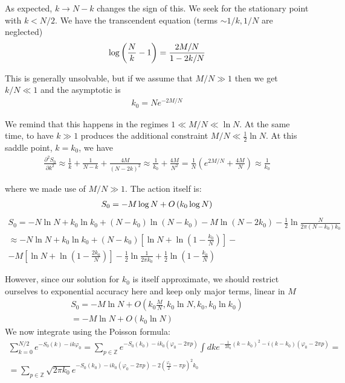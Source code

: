As expected, $k\to N-k$ changes the sign of this. We seek for the
stationary point with $k<N/2$. We have the transcendent equation
(terms $\sim1/k,1/N$ are neglected)
\begin{gather}
	\log\left(\frac{N}{k}-1\right)=\frac{2M/N}{1-2k/N}
\end{gather}


This is generally unsolvable, but if we assume that $M/N\gg1$ then
we get $k/N\ll1$ and the asymptotic is
\begin{gather}
k_{0}  =Ne^{-2M/N}
\end{gather}

We remind that this happens in the regimes $1\ll M/N\ll\ln N$. At
the same time, to have $k\gg1$ produces the additional constraint
$M/N\ll\frac{1}{2}\ln N$. At this saddle point, $k=k_{0}$, we have
\begin{gather}
\frac{\partial^{2}S_{0}}{\partial k^{2}}\approx\frac{1}{k}+\frac{1}{N-k}+\frac{4M}{(N-2k)^{2}}\approx\frac{1}{k_{0}}+\frac{4M}{N^{2}}=\frac{1}{N}\left(e^{2M/N}+\frac{4M}{N}\right)\approx\frac{1}{k_{0}}
\end{gather}

where we made use of $M/N\gg1$. The action itself is:
\begin{gather}
\label{mixed_refl_action}
S_0 = -M\log N + O\left(k_0 \log N\right)
\end{gather}
\begin{multline*}
S_{0}=-N\ln N+k_{0}\ln k_{0}+(N-k_{0})\ln(N-k_{0})-M\ln(N-2k_{0})-\frac{1}{2}\ln\frac{N}{2\pi(N-k_{0})k_{0}}\\
\approx-N\ln N+k_{0}\ln k_{0}+(N-k_{0})\left[\ln N+\ln(1-\frac{k_{0}}{N})\right]-\\
-M\left[\ln N+\ln(1-\frac{2k_{0}}{N})\right]-\frac{1}{2}\ln\frac{1}{2\pi k_{0}}+\frac{1}{2}\ln(1-\frac{k_{0}}{N})
\end{multline*}

However, since our solution for $k_{0}$ is itself approximate, we
should restrict ourselves to exponential accuracy here and keep only
major terms, linear in $M$
\begin{multline}
S_{0}  =-M\ln N+O(k_{0}\frac{M}{N},k_{0}\ln N,k_{0},k_{0}\ln k_{0})\\
 =-M\ln N+O(k_{0}\ln N)
\end{multline}
\fi
We now integrate using the Poisson formula:
\begin{multline}
\sum_{k=0}^{N/2}e^{-S_{0}(k)-ik\varphi_0}  
=
\sum_{p\in\mathbb{Z}}e^{-S_{0}(k_{0})-ik_{0}(\varphi_0-2\pi p)}\int dke^{-\frac{1}{2k_{0}}(k-k_{0})^{2}-i(k-k_{0})
	(\varphi_0-2\pi p)}
=
\\
 =\sum_{p\in\mathbb{Z}}
 \sqrt{2\pi k_{0}}
 e^{-S_{0}(k_{0})-ik_{0}(\varphi_0-2\pi p)-2(\frac{\varphi_0}{2}-\pi p)^{2}k_{0}}
\end{multline}

